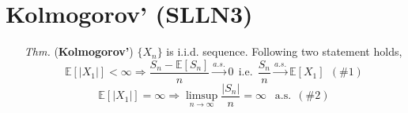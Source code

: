 \documentclass[a4paper,12pt,twoside]{book}
\begin{document}
\section{Kolmogorov' (SLLN3)}
\begin{itemize}
	\item[\textit{Thm.}] (\textbf{Kolmogorov'}) $\{X_n\}$ is i.i.d. sequence. Following two statement holds,
	\begin{equation}
		\mathbb{E}\left[|X_1|\right]<\infty\Rightarrow\frac{S_n - \mathbb{E}\left[S_n\right]}{n} \xrightarrow{a.s.} 0~~\text{i.e.}~~\frac{S_n}{n}\xrightarrow{a.s.}\mathbb{E}\left[X_1\right]~~(\#1)
	\end{equation}
	\begin{equation}
		\mathbb{E}\left[|X_1|\right]=\infty\Rightarrow \limsup\limits_{n\rightarrow\infty}\frac{|S_n|}{n}=\infty~~\text{ a.s.}~~(\#2)
	\end{equation}


\end{itemize}
\end{document}
